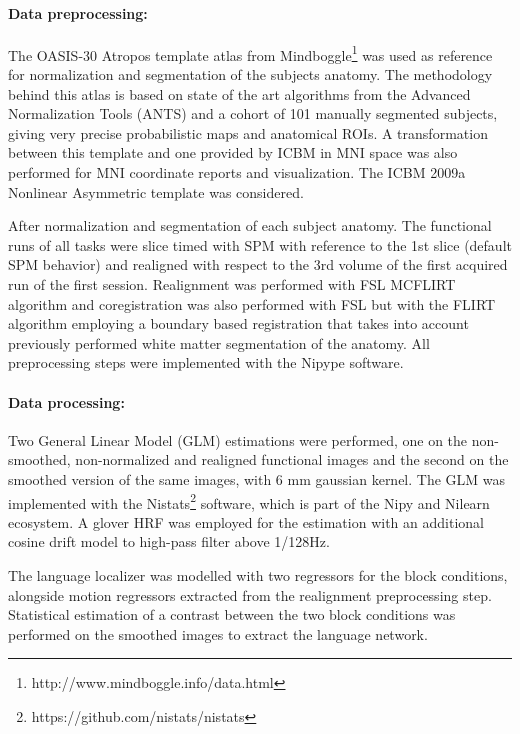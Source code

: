 \paragraph{Data preprocessing:}
The OASIS-30 Atropos template atlas from Mindboggle\footnote{http://www.mindboggle.info/data.html} was used as reference for normalization and segmentation of the subjects anatomy. The methodology behind this atlas is based on state of the art algorithms from the Advanced Normalization Tools (ANTS) and a cohort of 101 manually segmented subjects, giving very precise probabilistic maps and anatomical ROIs\citep{klein2005mindboggle}. A transformation between this template and one provided by ICBM in MNI space was also performed for MNI coordinate reports and visualization. The ICBM 2009a Nonlinear Asymmetric template was considered\citep{collins1999animal+}.

After normalization and segmentation of each subject anatomy. The functional runs of all tasks were slice timed with SPM with reference to the 1st slice (default SPM behavior) and realigned with respect to the 3rd volume of the first acquired run of the first session.
Realignment was performed with FSL MCFLIRT algorithm and coregistration was also performed with FSL but with the FLIRT algorithm employing a boundary based registration that takes into account previously performed white matter segmentation of the anatomy\citep{greve2009accurate}.
All preprocessing steps were implemented with the Nipype software\citep{gorgolewski2011nipype}.

\paragraph{Data processing:}
Two General Linear Model (GLM) estimations were performed, one on the non-smoothed, non-normalized and realigned functional images and the second on the smoothed version of the same images, with 6 mm gaussian kernel.
The GLM was implemented with the Nistats\footnote{https://github.com/nistats/nistats} software, which is part of the Nipy and Nilearn\citep{abraham2014machine} ecosystem.
A glover HRF was employed for the estimation with an additional cosine drift model to high-pass filter above 1/128Hz.

The language localizer was modelled with two regressors for the block conditions, alongside motion regressors extracted from the realignment preprocessing step.
Statistical estimation of a contrast between the two block conditions was performed on the smoothed images to extract the language network.

